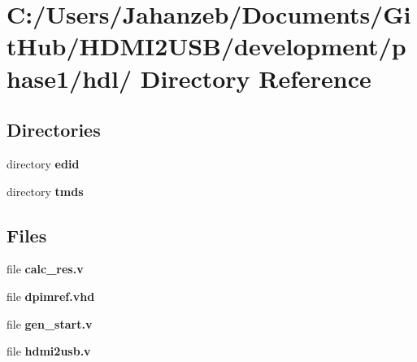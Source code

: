 \section{C\-:/\-Users/\-Jahanzeb/\-Documents/\-Git\-Hub/\-H\-D\-M\-I2\-U\-S\-B/development/phase1/hdl/ Directory Reference}
\label{dir_b95d22fb74c8ef837e5dec850a739e17}
\subsection*{Directories}
\begin{DoxyCompactItemize}
\item 
directory {\bf edid}
\item 
directory {\bf tmds}
\end{DoxyCompactItemize}
\subsection*{Files}
\begin{DoxyCompactItemize}
\item 
file {\bf calc\-\_\-res.\-v}
\item 
file {\bf dpimref.\-vhd}
\item 
file {\bf gen\-\_\-start.\-v}
\item 
file {\bf hdmi2usb.\-v}
\end{DoxyCompactItemize}
